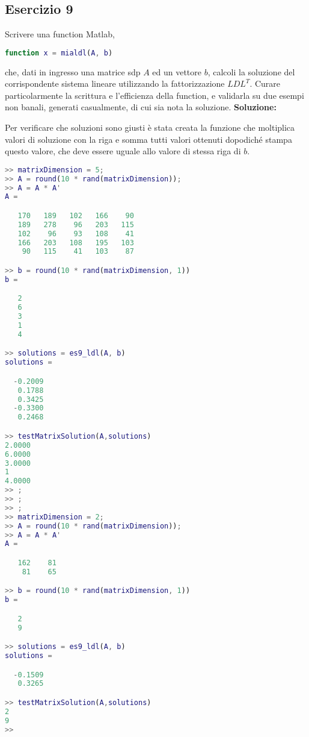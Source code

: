 \subsection{Esercizio 9}
Scrivere una function Matlab,
\begin{lstlisting}[language=Matlab]
function x = mialdl(A, b)
\end{lstlisting}
che, dati in ingresso una matrice sdp $A$ ed un vettore $b$, calcoli la soluzione
del corrispondente sistema lineare utilizzando la fattorizzazione $LDL^T$.
Curare particolarmente la scrittura e l'efficienza della function,
e validarla su due esempi non banali, generati casualmente, di cui sia nota la soluzione.
\newline \textbf{Soluzione:} \newline

Per verificare che soluzioni sono giusti è stata creata la funzione 
che moltiplica valori di soluzione con la riga e somma tutti valori ottenuti
dopodiché stampa questo valore, che deve essere uguale allo valore di stessa riga di $b$.
\begin{lstlisting}[language=Matlab]
>> matrixDimension = 5;
>> A = round(10 * rand(matrixDimension));
>> A = A * A'
A =

   170   189   102   166    90
   189   278    96   203   115
   102    96    93   108    41
   166   203   108   195   103
    90   115    41   103    87

>> b = round(10 * rand(matrixDimension, 1))
b =

   2
   6
   3
   1
   4

>> solutions = es9_ldl(A, b)
solutions =

  -0.2009
   0.1788
   0.3425
  -0.3300
   0.2468

>> testMatrixSolution(A,solutions)
2.0000
6.0000
3.0000
1
4.0000
>> ;
>> ;
>> ;
>> matrixDimension = 2;
>> A = round(10 * rand(matrixDimension));
>> A = A * A'
A =

   162    81
    81    65

>> b = round(10 * rand(matrixDimension, 1))
b =

   2
   9

>> solutions = es9_ldl(A, b)
solutions =

  -0.1509
   0.3265

>> testMatrixSolution(A,solutions)
2
9
>>
\end{lstlisting}
